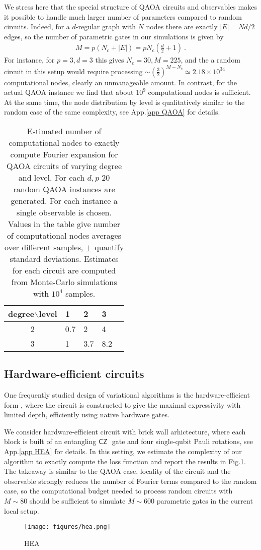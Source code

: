 \documentclass[twocolumn, amsfonts, amssymb, aps, nofootinbib]{revtex4-2}
\newcommand{\CZ}{\textsf{CZ }}
\begin{document}
We stress here that the special structure of QAOA circuits and observables makes it possible to handle much larger number of parameters compared to random circuits. Indeed, for a $d$-regular graph with $N$ nodes there are exactly $|E|=Nd/2$ edges, so the number of parametric gates in our simulations is given by
\begin{align}
	M=p(N_c+|E|)=pN_c\left(\frac{d}{2}+1\right) \ .
\end{align}
For instance, for $p=3, d=3$ this gives $N_c=30, M=225$, and the a random circuit in this setup would require processing $\sim \left(\frac32\right)^{M-N_c}\simeq 2.18\times 10^{34}$ computational nodes, clearly an unmanageable amount. In contrast, for the actual QAOA instance we find that about $10^9$ computational nodes is sufficient. At the same time, the node distribution by level is qualitatively similar to the random case of the same complexity, see App.\ref{app QAOA} for details.
\begin{table}
	\begin{tabular}{cllll}
		\toprule
	degree$\backslash$level&  1 & 2 & 3&\\ \hline
      2  &0.7  &2  &4  \\
	  3	&1  &3.7  &8.2 &  \\
      \bottomrule
	\end{tabular}
\caption{Estimated number of computational nodes to exactly compute Fourier expansion for QAOA circuits of varying degree and level. For each $d, p$ 20 random QAOA instances are generated. For each instance a single observable is chosen. Values in the table give number of computational nodes averages over different samples, $\pm$ quantify standard deviations. Estimates for each circuit are computed from Monte-Carlo simulations with $10^4$ samples.}
\label{tab QAOA}
\end{table}
\subsection{Hardware-efficient circuits}
One frequently studied design of variational algorithms is the hardware-efficient form \cite{Kandala2017}, where the circuit is constructed to give the maximal expressivity with limited depth, efficiently using native hardware gates. 

We consider hardware-efficient circuit with brick wall arhictecture, where each block is built of an entangling $\CZ$ gate and four single-qubit Pauli rotations, see App.\ref{app HEA} for details. In this setting, we estimate the complexity of our algorithm to exactly compute the loss function and report the results in Fig.\ref{fig HEA}. The takeaway is similar to the QAOA case, locality of the circuit and the observable strongly reduces the number of Fourier terms compared to the random case, so the computational budget needed to process random circuits with $M\sim 80$ should be sufficient to simulate $M\sim600$ parametric gates in the current local setup.
\begin{figure}
	\texttt{[image: figures/hea.png]}
	\caption{HEA}
	\label{fig HEA}
\end{figure}
\end{document}
